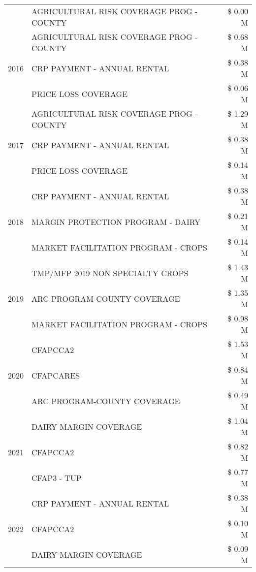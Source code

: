 \begin{tabular}{llr}
 & AGRICULTURAL RISK COVERAGE PROG - COUNTY & \$ 0.00 M \\
\cline{1-3}
\multirow[t]{3}{*}{2016} & AGRICULTURAL RISK COVERAGE PROG - COUNTY & \$ 0.68 M \\
 & CRP PAYMENT - ANNUAL RENTAL & \$ 0.38 M \\
 & PRICE LOSS COVERAGE & \$ 0.06 M \\
\cline{1-3}
\multirow[t]{3}{*}{2017} & AGRICULTURAL RISK COVERAGE PROG - COUNTY & \$ 1.29 M \\
 & CRP PAYMENT - ANNUAL RENTAL & \$ 0.38 M \\
 & PRICE LOSS COVERAGE & \$ 0.14 M \\
\cline{1-3}
\multirow[t]{3}{*}{2018} & CRP PAYMENT - ANNUAL RENTAL & \$ 0.38 M \\
 & MARGIN PROTECTION PROGRAM - DAIRY & \$ 0.21 M \\
 & MARKET FACILITATION PROGRAM - CROPS & \$ 0.14 M \\
\cline{1-3}
\multirow[t]{3}{*}{2019} & TMP/MFP 2019 NON SPECIALTY CROPS & \$ 1.43 M \\
 & ARC PROGRAM-COUNTY COVERAGE & \$ 1.35 M \\
 & MARKET FACILITATION PROGRAM - CROPS & \$ 0.98 M \\
\cline{1-3}
\multirow[t]{3}{*}{2020} & CFAPCCA2 & \$ 1.53 M \\
 & CFAPCARES & \$ 0.84 M \\
 & ARC PROGRAM-COUNTY COVERAGE & \$ 0.49 M \\
\cline{1-3}
\multirow[t]{3}{*}{2021} & DAIRY MARGIN COVERAGE & \$ 1.04 M \\
 & CFAPCCA2 & \$ 0.82 M \\
 & CFAP3 - TUP & \$ 0.77 M \\
\cline{1-3}
\multirow[t]{3}{*}{2022} & CRP PAYMENT - ANNUAL RENTAL & \$ 0.38 M \\
 & CFAPCCA2 & \$ 0.10 M \\
 & DAIRY MARGIN COVERAGE & \$ 0.09 M \\
\cline{1-3}
\bottomrule
\end{tabular}
